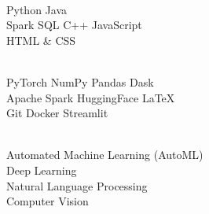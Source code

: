 \documentclass[]{deedy-resume-openfont}
\begin{document}
\begin{minipage}[t]{.315\textwidth}
     \\
    Python 
    \enspace \textbullet \enspace 
    Java 
    \subsectionsep
    \\
    Spark SQL
    \enspace \textbullet \enspace 
    C++
    \enspace \textbullet \enspace 
    JavaScript \\  
    HTML \& CSS \\
\end{minipage} \hfill 
\begin{minipage}[t]{.335\textwidth}
    \\
    PyTorch 
    \enspace \textbullet \enspace 
    NumPy
    \enspace \textbullet \enspace 
    Pandas 
    \enspace \textbullet \enspace  
    Dask \\
    Apache Spark
    \enspace \textbullet \enspace  
    HuggingFace
    \enspace \textbullet \enspace  
    LaTeX
    \subsectionsep
    \\
    Git
    \enspace \textbullet \enspace 
    Docker 
    \enspace \textbullet \enspace 
    Streamlit
    \subsectionsep
    \\
\end{minipage} \hfill 
\begin{minipage}[t]{.325\textwidth}
    \\
    Automated Machine Learning (AutoML) \\
    Deep Learning \\
    Natural Language Processing \\
    Computer Vision \\
    \subsectionsep
\end{minipage}
\sectionsep
\end{document}
